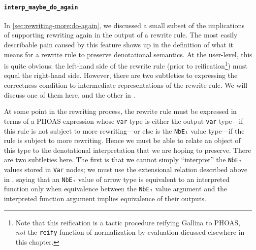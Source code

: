 \paragraph{\texorpdfstring{\texttt{interp_maybe_do_again}}{interp\_maybe\_do\_again}}
In \autoref{sec:rewriting-more:do-again}, we discussed a small subset of the implications of supporting rewriting again in the output of a rewrite rule.
The most easily describable pain caused by this feature shows up in the definition of what it means for a rewrite rule to preserve denotational semantics.
At the user-level, this is quite obvious: the left-hand side of the rewrite rule (prior to reification\footnote{%
  Note that this reification is a tactic procedure reifying Gallina to PHOAS, \emph{not} the \texttt{reify} function of normalization by evaluation dicussed elsewhere in this chapter.%
}) must equal the right-hand side.
However, there are two subtleties to expressing the correctness condition to intermediate representations of the rewrite rule.
We will discuss one of them here, and the other in .

At some point in the rewriting process, the rewrite rule must be expressed in terms of a PHOAS expression whose \texttt{var} type is either the output \texttt{var} type---if this rule is not subject to more rewriting---or else is the \texttt{NbEₜ} value type---if the rule is subject to more rewriting.
Hence we must be able to relate an object of this type to the denotational interpretation that we are hoping to preserve.
There are two subtleties here.
The first is that we cannot simply ``interpret'' the \texttt{NbEₜ} values stored in \texttt{Var} nodes; we must use the extensional relation described above in , saying that an \texttt{NbEₜ} value of arrow type is equivalent to an interpreted function only when equivalence between the \texttt{NbEₜ} value argument and the interpreted function argument implies equivalence of their outputs.

